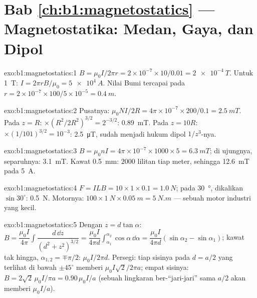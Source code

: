\section*{Bab \ref{ch:b1:magnetostatics} --- Magnetostatika: Medan, Gaya, dan Dipol}

\begin{solution}{exo:b1:magnetostatics:1}
$B = \mu_0I/2\pi r = 2 \times 10^{-7} \times 10/0.01 = \qty{2e-4}{T}$. Untuk \qty{1}{T}:
$I = 2\pi rB/\mu_0 = \qty{5e4}{A}$. Nilai Bumi tercapai pada $r = 2 \times 10^{-7} \times
100/5 \times 10^{-5} = \qty{0.4}{m}$.
\end{solution}

\begin{solution}{exo:b1:magnetostatics:2}
Pusatnya: $\mu_0NI/2R = 4\pi \times 10^{-7} \times 200/0.1 = \qty{2.5}{mT}$. Pada $z = R$:
$\times(R^2/2R^2)^{3/2} = 2^{-3/2}$: \qty{0.89}{mT}. Pada $z = 10R$: $\times(1/101)^{3/2}
= 10^{-3}$: \qty{2.5}{\micro T}, sudah menjadi hukum dipol $1/z^3$-nya.
\end{solution}

\begin{solution}{exo:b1:magnetostatics:3}
$B = \mu_0nI = 4\pi \times 10^{-7} \times 1000 \times 5 = \qty{6.3}{mT}$; di ujungnya,
separuhnya: \qty{3.1}{mT}. Kawat \qty{0.5}{mm}: $2000$ lilitan tiap meter, sehingga
\qty{12.6}{mT} pada \qty{5}{A}.
\end{solution}

\begin{solution}{exo:b1:magnetostatics:4}
$F = ILB = 10 \times 1 \times 0.1 = \qty{1.0}{N}$; pada \qty{30}{\degree}, dikalikan $\sin30^\circ$:
\qty{0.5}{N}. Motornya: $100 \times \qty{1}{N} \times \qty{0.05}{m} = \qty{5}{N.m}$ ---
sebuah motor industri yang kecil.
\end{solution}

\begin{solution}{exo:b1:magnetostatics:5}
Dengan $z = d\tan\alpha$: $B = \dfrac{\mu_0I}{4\pi}\displaystyle\int\dfrac{d\,\dd z}{(d^2 + z^2)^{3/2}}
= \dfrac{\mu_0I}{4\pi d}\displaystyle\int_{\alpha_1}^{\alpha_2}\cos\alpha\,\dd\alpha = \dfrac{\mu_0I}{4\pi d}
(\sin\alpha_2 - \sin\alpha_1)$; kawat tak hingga, $\alpha_{1,2} = \mp\pi/2$: $\mu_0I/2\pi d$.
Persegi: tiap sisinya pada $d = a/2$ yang terlihat di bawah $\pm45^\circ$ memberi $\mu_0I\sqrt2/2\pi a$;
empat sisinya: $B = 2\sqrt2\,\mu_0I/\pi a = 0.90\,\mu_0I/a$ (sebuah lingkaran ber-``jari-jari''
sama $a/2$ akan memberi $\mu_0I/a$).
\end{solution}

